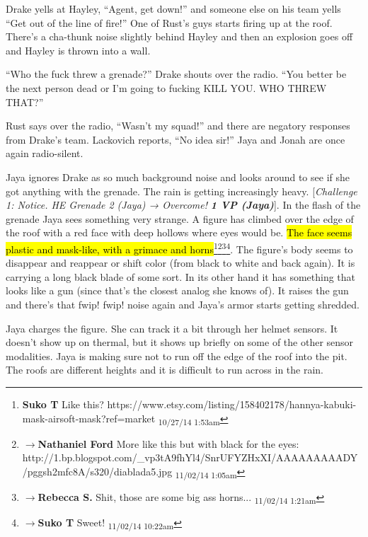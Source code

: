 Drake yells at Hayley, ``Agent, get down!''  and someone else on his team yells ``Get out of the line of fire!''  One of Rust's guys starts firing up at the roof.  There's a cha-thunk noise slightly behind Hayley and then an explosion goes off and Hayley is thrown into a wall.



``Who the fuck threw a grenade?'' Drake shouts over the radio.  ``You better be the next person dead or I'm going to fucking KILL YOU.  WHO THREW THAT?''

Rust says over the radio, ``Wasn't my squad!'' and there are negatory responses from Drake's team.  Lackovich reports, ``No idea sir!''  Jaya and Jonah are once again radio-silent.



Jaya ignores Drake as so much background noise and looks around to see if she got anything with the grenade.  The rain is getting increasingly heavy.  {[}\textit{Challenge 1: Notice.  HE Grenade 2 (Jaya) → Overcome! }\textit{\textbf{1 VP (Jaya)}}{]}.  In the flash of the grenade Jaya sees something very strange.  A figure has climbed over the edge of the roof with a red face with deep hollows where eyes would be. \hl{The face seems plastic and mask-like, with a grimace and horns}\footnote{\textbf{Suko T }Like this?
https://www.etsy.com/listing/158402178/hannya-kabuki-mask-airsoft-mask?ref=market \textsubscript{10/27/14 1:53am}}\footnote{$\rightarrow$\textbf{Nathaniel Ford }More like this but with black for the eyes:
http://1.bp.blogspot.com/\_vp3tA9fhYl4/SnrUFYZHxXI/AAAAAAAAADY/pggsh2mfc8A/s320/diablada5.jpg \textsubscript{11/02/14 1:05am}}\footnote{$\rightarrow$\textbf{Rebecca S. }Shit, those are some big ass horns... \textsubscript{11/02/14 1:21am}}\footnote{$\rightarrow$\textbf{Suko T }Sweet! \textsubscript{11/02/14 10:22am}}.  The figure's body seems to disappear and reappear or shift color (from black to white and back again).  It is carrying a long black blade of some sort.  In its other hand it has something that looks like a gun (since that's the closest analog she knows of).  It raises the gun and there's that fwip! fwip! noise again and Jaya's armor starts getting shredded.



Jaya charges the figure.  She can track it a bit through her helmet sensors.  It doesn't show up on thermal, but it shows up briefly on some of the other sensor modalities.  Jaya is making sure not to run off the edge of the roof into the pit. The roofs are different heights and it is difficult to run across in the rain.



